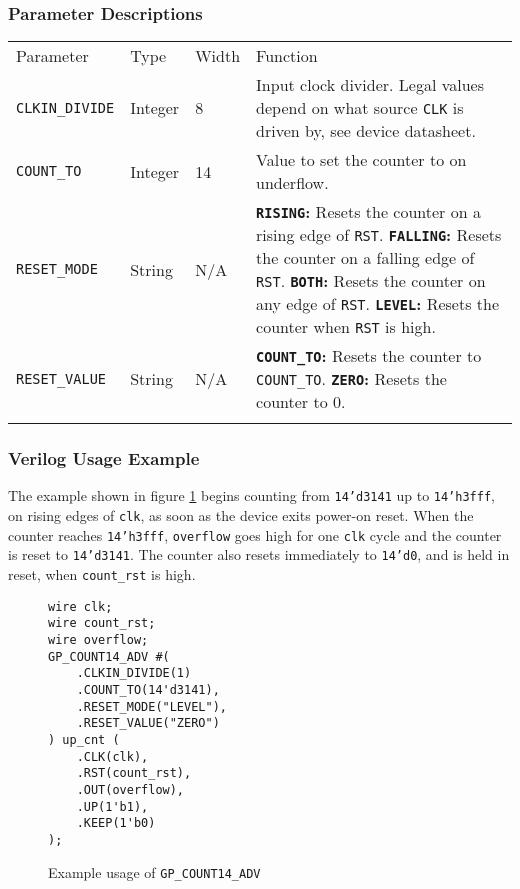 \documentclass[11pt]{article}
\newcommand{\tokenstyle}[1]{\texttt{#1}}
\newcommand{\wirestyle}[1]{\texttt{#1}}
\newcommand{\valuestyle}[1]{\texttt{#1}}
\newcommand{\strvaluestyle}[1]{\valuestyle{\textquotedbl#1\textquotedbl}}
\newcommand{\strexamplestyle}[1]{\textbf{\strvaluestyle{#1}:}}
\newcommand{\datastyle}[1]{\texttt{#1}}
\newcommand{\whenstyle}[1]{{\fontseries{sb}\selectfont#1}}
\newcommand{\thinhline}{\Xhline{1\arrayrulewidth}}
\newcommand{\thickhline}{\Xhline{2.5\arrayrulewidth}}
\begin{document}
\subsubsection{Parameter Descriptions}

\begin{tabularx}{\textwidth}{lllX}
\thinhline
\whenstyle{Parameter} & \whenstyle{Type} & \whenstyle{Width} & \whenstyle{Function} \\
\thickhline
\tokenstyle{CLKIN\_DIVIDE} & Integer & 8 &
	Input clock divider. Legal values depend on what source \tokenstyle{CLK} is driven by, see device datasheet.\\
\thinhline
\tokenstyle{COUNT\_TO} & Integer & 14 & Value to set the counter to on underflow. \\
\thinhline
\tokenstyle{RESET\_MODE} & String & N/A &
	\strexamplestyle{RISING} Resets the counter on a rising edge of \tokenstyle{RST}. \newline
	\strexamplestyle{FALLING} Resets the counter on a falling edge of \tokenstyle{RST}. \newline
	\strexamplestyle{BOTH} Resets the counter on any edge of \tokenstyle{RST}. \newline
	\strexamplestyle{LEVEL} Resets the counter when \tokenstyle{RST} is high. \\
\thinhline
\tokenstyle{RESET\_VALUE} & String & N/A &
	\strexamplestyle{COUNT\_TO} Resets the counter to \tokenstyle{COUNT\_TO}. \newline
	\strexamplestyle{ZERO} Resets the counter to 0. \\
\thinhline
\end{tabularx}

\subsubsection{Verilog Usage Example}

The example shown in figure \ref{gp-count14-adv-example} begins counting from \datastyle{14'd3141} up to
\datastyle{14'h3fff}, on rising edges of \wirestyle{clk}, as soon as the device exits power-on reset.
When the counter reaches \datastyle{14'h3fff}, \wirestyle{overflow} goes high for one \wirestyle{clk} cycle and
the counter is reset to \datastyle{14'd3141}. The counter also resets immediately to \datastyle{14'd0}, and
is held in reset, when \wirestyle{count\_rst} is high.

\begin{figure}[h]
\begin{lstlisting}
wire clk;
wire count_rst;
wire overflow;
GP_COUNT14_ADV #(
	.CLKIN_DIVIDE(1)
	.COUNT_TO(14'd3141),
	.RESET_MODE("LEVEL"),
	.RESET_VALUE("ZERO")
) up_cnt (
	.CLK(clk),
	.RST(count_rst),
	.OUT(overflow),
	.UP(1'b1),
	.KEEP(1'b0)
);
\end{lstlisting}
\caption{Example usage of \tokenstyle{GP\_COUNT14\_ADV}}
\label{gp-count14-adv-example}
\end{figure}
\end{document}

